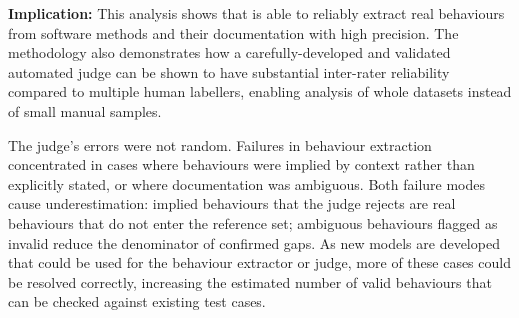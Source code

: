 \smallskip
\noindent\textbf{Implication:} This analysis shows that \toolname{} is able to reliably extract real behaviours from software methods and their documentation with high precision. 
The methodology also demonstrates how a carefully-developed and validated automated judge can be shown to have substantial inter-rater reliability compared to multiple human labellers, enabling analysis of whole datasets instead of small manual samples.

The judge's errors were not random. Failures in behaviour extraction concentrated in cases where behaviours were implied by context rather than explicitly stated, or where documentation was ambiguous. 
Both failure modes cause underestimation: implied behaviours that the judge rejects are real behaviours that do not enter the reference set; ambiguous behaviours flagged as invalid reduce the denominator of confirmed gaps. 
As new models are developed that could be used for the behaviour extractor or judge, more of these cases could be resolved correctly, increasing the estimated number of valid behaviours that can be checked against existing test cases.





